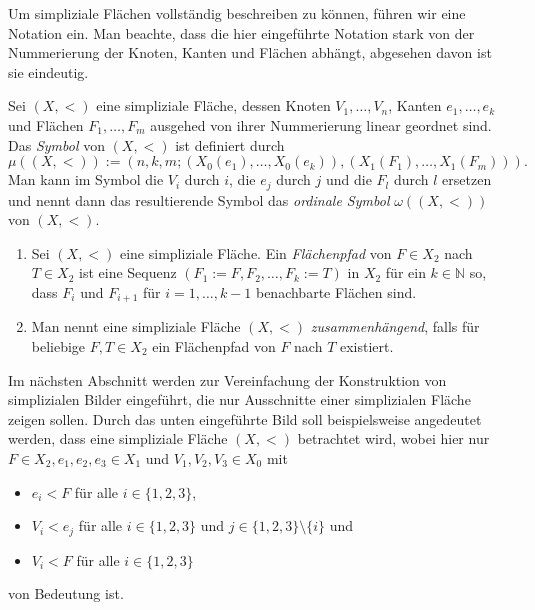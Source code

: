 \documentclass[12pt,titlepage]{article}
\begin{document}
Um simpliziale Flächen vollständig beschreiben zu können, führen wir eine Notation ein. Man beachte, dass die hier eingeführte Notation stark von der Nummerierung der Knoten, Kanten und Flächen abhängt, abgesehen davon ist sie eindeutig.
\begin{definition}
 Sei $(X,<)$ eine simpliziale Fläche, dessen Knoten $V_{1},\ldots,V_{n}$, Kanten $e_{1},\ldots,e_{k}$ und Flächen $F_{1},\ldots,F_{m}$ ausgehed von ihrer Nummerierung linear geordnet sind. Das \emph{Symbol} von $(X,<)$ ist definiert durch 
\[
\mu((X,<)):=(n,k,m;(X_{0}(e_{1}),\ldots,X_{0}(e_{k})),(X_{1}(F_{1}),\ldots,X_{1}(F_{m}))).
\]
Man kann im Symbol die $V_{i}$ durch $i$, die $e_{j}$ durch $j$ und die $F_{l}$ durch $l$ ersetzen und nennt dann das resultierende Symbol das \emph{ordinale Symbol} $\omega((X,<))$ von $(X,<)$.
\end{definition}
\begin{definition} 
\begin{enumerate}
\item Sei $(X,<)$ eine simpliziale Fläche. Ein \emph{Flächenpfad} von $F\in X_{2}$ nach $T \in X_{2}$ ist eine Sequenz $(F_{1}:=F,F_{2},\ldots,F_{k}:=T)$ in $X_{2}$ für ein $k \in \mathbb{N}$ so, dass $F_{i} $ und $F_{i+1}$ für $i=1,\ldots,k-1$ benachbarte Flächen sind.
\item Man nennt eine simpliziale Fläche $(X,<)$ \emph{zusammenhängend}, falls für beliebige $F,T \in X_{2}$ ein Flächenpfad von $F$ nach $T$ existiert.
\end {enumerate}
\end{definition}

Im nächsten Abschnitt werden zur Vereinfachung der Konstruktion von simplizialen Bilder eingeführt, die nur Ausschnitte einer simplizialen Fläche zeigen sollen. Durch das unten eingeführte Bild soll beispielsweise angedeutet werden, dass eine simpliziale Fläche $(X,<)$ betrachtet wird, wobei hier nur $F\in X_2,e_1,e_2,e_3\in X_1$ und $V_1,V_2,V_3 \in X_0$ mit 
\begin{itemize}
 \item $e_{i} < F$ für alle $i \in \{1,2,3\}$,
 \item $V_{i}<e_{j}$ für alle $i \in \{1,2,3\}$ und $j \in \{1,2,3\} \setminus\{i\}$ und
 \item $V_{i} < F$ für alle $i \in \{1,2,3\}$
\end{itemize}  
von Bedeutung ist.\\
\end{document}
